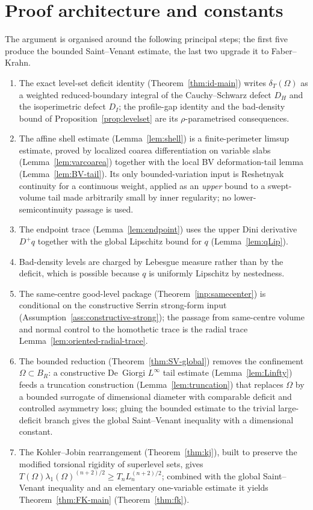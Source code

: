 \documentclass[11pt]{amsart}
\theoremstyle{definition}
\newcommand{\Om}{\Omega}
\newcommand{\dT}{\delta_T}
\begin{document}




\section{Proof architecture and constants}\label{sec:architecture}

The argument is organised around the following principal steps; the first five
produce the bounded Saint--Venant estimate, the last two upgrade it to
Faber--Krahn.
\begin{enumerate}[leftmargin=2em]
\item The exact level-set deficit identity (Theorem~\ref{thm:id-main}) writes
\(\dT(\Om)\) as a weighted reduced-boundary integral of the Cauchy--Schwarz
defect \(D_H\) and the isoperimetric defect \(D_I\); the profile-gap identity
and the bad-density bound of Proposition~\ref{prop:levelset} are its
\(\rho\)-parametrised consequences.
\item The affine shell estimate (Lemma~\ref{lem:shell}) is a finite-perimeter
limsup estimate, proved by localized coarea differentiation on variable slabs
(Lemma~\ref{lem:varcoarea}) together with the local BV deformation-tail lemma
(Lemma~\ref{lem:BV-tail}).  Its only bounded-variation input is Reshetnyak
continuity for a continuous weight, applied as an \emph{upper} bound to a
swept-volume tail made arbitrarily small by inner regularity; no
lower-semicontinuity passage is used.
\item The endpoint trace (Lemma~\ref{lem:endpoint}) uses the upper Dini
derivative \(D^+q\) together with the global Lipschitz bound for \(q\)
(Lemma~\ref{lem:qLip}).
\item Bad-density levels are charged by Lebesgue measure rather than by the
deficit, which is possible because \(q\) is uniformly Lipschitz by nestedness.
\item The same-centre good-level package (Theorem~\ref{inp:samecenter}) is
conditional on the constructive Serrin strong-form input
(Assumption~\ref{ass:constructive-strong}); the passage from same-centre volume
and normal control to the homothetic trace is the radial trace
Lemma~\ref{lem:oriented-radial-trace}.
\item The bounded reduction (Theorem~\ref{thm:SV-global}) removes the
confinement \(\Om\subset B_R\): a constructive De~Giorgi \(L^\infty\) tail
estimate (Lemma~\ref{lem:Linfty}) feeds a truncation construction
(Lemma~\ref{lem:truncation}) that replaces \(\Om\) by a bounded surrogate of
dimensional diameter with comparable deficit and controlled asymmetry loss;
gluing the bounded estimate to the trivial large-deficit branch gives the
global Saint--Venant inequality with a dimensional constant.
\item The Kohler--Jobin rearrangement (Theorem~\ref{thm:kj}), built to preserve
the modified torsional rigidity of superlevel sets, gives
\(T(\Om)\lambda_1(\Om)^{(n+2)/2}\ge T_n L_n^{(n+2)/2}\); combined with the
global Saint--Venant inequality and an elementary one-variable estimate it
yields Theorem~\ref{thm:FK-main} (Theorem~\ref{thm:fk}).
\end{enumerate}
\end{document}
